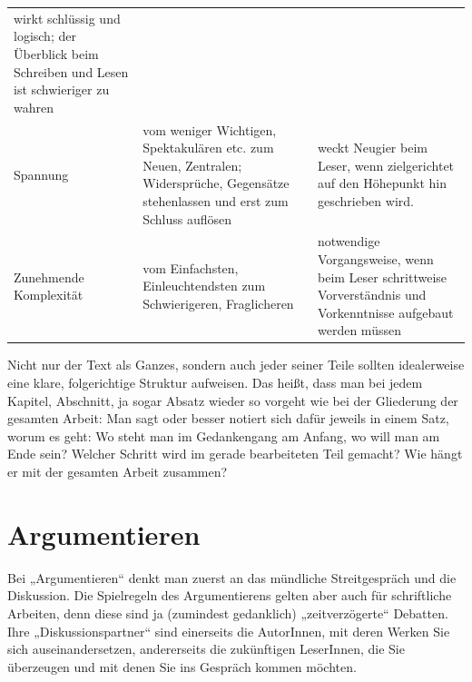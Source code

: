 \documentclass[]{book}
\theoremstyle{definition}
\theoremstyle{definition}
\theoremstyle{definition}
\theoremstyle{remark}
\begin{document}
\begin{longtable}[]{@{}lll@{}}
\begin{minipage}[t]{0.33\columnwidth}
wirkt schlüssig und logisch; der Überblick beim Schreiben und Lesen ist
schwieriger zu wahren \vspace{-6mm}\strut
\end{minipage}\tabularnewline
\begin{minipage}[t]{0.19\columnwidth}\raggedright\strut
Spannung\strut
\end{minipage} & \begin{minipage}[t]{0.39\columnwidth}\raggedright\strut
vom weniger Wichtigen, Spektakulären etc. zum Neuen, Zentralen;
Widersprüche, Gegensätze stehenlassen und erst zum Schluss
auflösen\strut
\end{minipage} & \begin{minipage}[t]{0.33\columnwidth}\raggedright\strut
weckt Neugier beim Leser, wenn zielgerichtet auf den Höhepunkt hin
geschrieben wird. \vspace{-6mm}\strut
\end{minipage}\tabularnewline
\begin{minipage}[t]{0.19\columnwidth}\raggedright\strut
Zunehmende Komplexität\strut
\end{minipage} & \begin{minipage}[t]{0.39\columnwidth}\raggedright\strut
vom Einfachsten, Einleuchtendsten zum Schwierigeren, Fraglicheren\strut
\end{minipage} & \begin{minipage}[t]{0.33\columnwidth}\raggedright\strut
notwendige Vorgangsweise, wenn beim Leser schrittweise Vorverständnis
und Vorkenntnisse aufgebaut werden müssen\strut
\end{minipage}\tabularnewline
\bottomrule
\end{longtable}

Nicht nur der Text als Ganzes, sondern auch jeder seiner Teile sollten
idealerweise eine klare, folgerichtige Struktur aufweisen. Das heißt,
dass man bei jedem Kapitel, Abschnitt, ja sogar Absatz wieder so vorgeht
wie bei der Gliederung der gesamten Arbeit: Man sagt oder besser notiert
sich dafür jeweils in einem Satz, worum es geht: Wo steht man im
Gedankengang am Anfang, wo will man am Ende sein? Welcher Schritt wird
im gerade bearbeiteten Teil gemacht? Wie hängt er mit der gesamten
Arbeit zusammen?

\section{Argumentieren}\label{argumentieren}

Bei „Argumentieren`` denkt man zuerst an das mündliche Streitgespräch
und die Diskussion. Die Spielregeln des Argumentierens gelten aber auch
für schriftliche Arbeiten, denn diese sind ja (zumindest gedanklich)
„zeitverzögerte`` Debatten. Ihre „Diskussionspartner`` sind einerseits
die AutorInnen, mit deren Werken Sie sich auseinandersetzen,
andererseits die zukünftigen LeserInnen, die Sie überzeugen und mit
denen Sie ins Gespräch kommen möchten.
\end{document}
